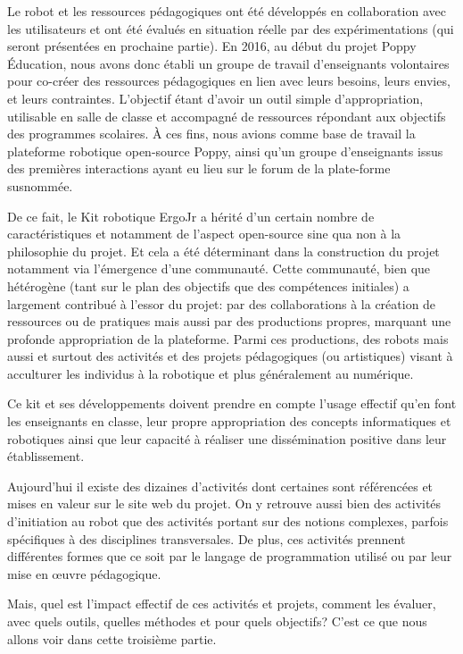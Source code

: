 \begin{concluPart}
Le robot et les ressources pédagogiques ont été développés en collaboration avec les utilisateurs et ont été évalués en situation réelle par des expérimentations (qui seront présentées en prochaine partie). En 2016, au début du projet Poppy Éducation, nous avons donc établi un groupe de travail d’enseignants volontaires pour co-créer des ressources pédagogiques en lien avec leurs besoins, leurs envies, et leurs contraintes. L'objectif étant d'avoir un outil simple d’appropriation, utilisable en salle de classe et accompagné de ressources  répondant aux objectifs des programmes scolaires. 
À ces fins, nous avions comme base de travail la plateforme robotique open-source Poppy, ainsi qu'un groupe d'enseignants issus des premières interactions ayant eu lieu sur le forum de la plate-forme susnommée.\par%
De ce fait, le Kit robotique ErgoJr a hérité d'un certain nombre de caractéristiques et notamment de l'aspect open-source sine qua non à la philosophie du projet. Et cela a été déterminant dans la construction du projet notamment via l'émergence d'une communauté. Cette communauté, bien que hétérogène (tant sur le plan des objectifs que des compétences initiales) a largement contribué à l'essor du projet: par des collaborations à la création de ressources ou de pratiques mais aussi par des productions propres, marquant une profonde appropriation de la plateforme.
Parmi ces productions, des robots mais aussi et surtout des activités et des projets pédagogiques (ou artistiques) visant à acculturer les individus à la robotique et plus généralement au numérique.\par%
Ce kit et ses développements  doivent prendre en compte l’usage effectif qu’en font les enseignants en classe, leur propre appropriation des concepts informatiques et robotiques ainsi que leur capacité à réaliser une dissémination positive dans leur établissement.\par%
Aujourd'hui il existe des dizaines d'activités dont certaines sont référencées et mises en valeur sur le site web du projet.
On y retrouve aussi bien des activités d'initiation au robot que des activités portant sur des notions complexes, parfois spécifiques à des disciplines transversales. 
De plus, ces activités prennent différentes formes que ce soit par le langage de programmation utilisé ou par leur mise en œuvre pédagogique.\par%
Mais, quel est l'impact effectif de ces activités et projets, comment les évaluer, avec quels outils, quelles méthodes et pour quels objectifs? C'est ce que nous allons voir dans cette troisième partie.
\end{concluPart}
